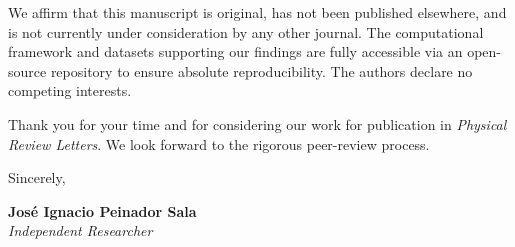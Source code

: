 \documentclass[11pt,a4paper]{article}
\begin{document}
We affirm that this manuscript is original, has not been published elsewhere, and is not currently under consideration by any other journal. The computational framework and datasets supporting our findings are fully accessible via an open-source repository to ensure absolute reproducibility. The authors declare no competing interests.

Thank you for your time and for considering our work for publication in \textit{Physical Review Letters}. We look forward to the rigorous peer-review process.

\vspace{1cm}

Sincerely,

\vspace{0.5cm}

\textbf{José Ignacio Peinador Sala}\\
\textit{Independent Researcher}
\end{document}

